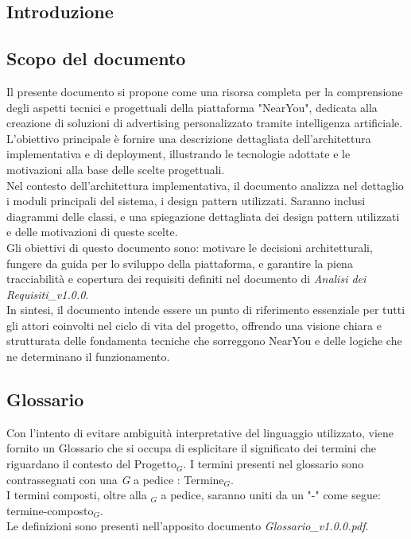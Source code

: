 \documentclass[10pt]{article}
\begin{document}
\newpage
\tableofcontents
\newpage
\listoffigures %
\newpage
\listoftables %
\newpage
\begin{justify}

\section{Introduzione}
\subsection{Scopo del documento}
Il presente documento si propone come una risorsa completa per la comprensione degli aspetti tecnici e progettuali della piattaforma "NearYou", dedicata alla 
creazione di soluzioni di advertising personalizzato tramite intelligenza artificiale. L’obiettivo principale è fornire una descrizione dettagliata dell’architettura 
implementativa e di deployment, illustrando le tecnologie adottate e le motivazioni alla base delle scelte progettuali.\\
Nel contesto dell'architettura implementativa, il documento analizza nel dettaglio i moduli principali del sistema, i design pattern utilizzati. Saranno inclusi 
diagrammi delle classi, e una spiegazione dettagliata dei design pattern utilizzati e delle motivazioni di queste scelte.\\
Gli obiettivi di questo documento sono: motivare le decisioni architetturali, fungere da guida per lo sviluppo della piattaforma, e garantire la piena tracciabilità e 
copertura dei requisiti definiti nel documento di \textit{Analisi dei Requisiti\_v1.0.0}.\\
In sintesi, il documento intende essere un punto di riferimento essenziale per tutti gli attori coinvolti nel ciclo di vita del progetto, offrendo una visione chiara e 
strutturata delle fondamenta tecniche che sorreggono NearYou e delle logiche che ne determinano il funzionamento.\\

\subsection{Glossario}
Con l'intento di evitare ambiguità interpretative del linguaggio utilizzato, viene fornito un Glossario che si occupa di esplicitare il significato dei termini che riguardano il contesto del Progetto$_G$. I termini presenti nel glossario sono contrassegnati con una \textit{G} a pedice : Termine$_G$.\\
I termini composti, oltre alla $_G$ a pedice, saranno uniti da un "-" come segue: termine-composto$_G$.\\
Le definizioni sono presenti nell'apposito documento \textit{Glossario\_v1.0.0.pdf}.


\end{justify}
\end{document}
